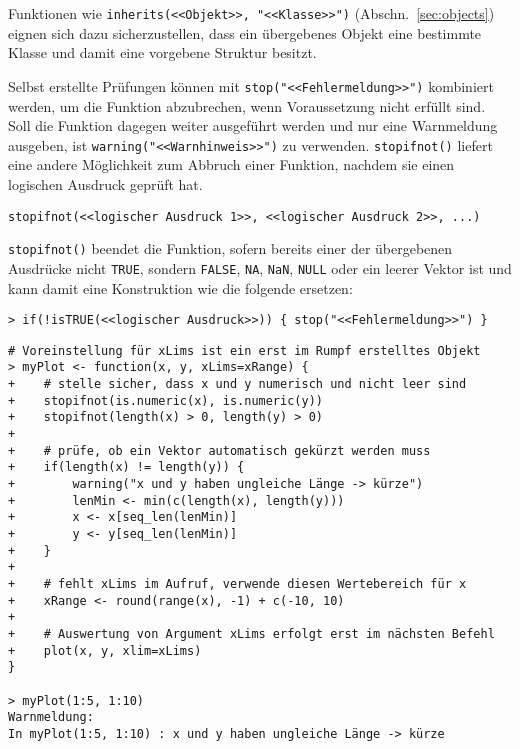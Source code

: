 Funktionen wie \lstinline!inherits(<<Objekt>>, "<<Klasse>>")! (Abschn.\ \ref{sec:objects}) eignen sich dazu sicherzustellen, dass ein übergebenes Objekt eine bestimmte Klasse und damit eine vorgebene Struktur besitzt.

Selbst erstellte Prüfungen können mit  \lstinline!stop("<<Fehlermeldung>>")! kombiniert werden, um die Funktion abzubrechen, wenn Voraussetzung nicht erfüllt sind. Soll die Funktion dagegen weiter ausgeführt werden und nur eine Warnmeldung ausgeben, ist  \lstinline!warning("<<Warnhinweis>>")! zu verwenden. \lstinline!stopifnot()! liefert eine andere Möglichkeit zum Abbruch einer Funktion, nachdem sie einen logischen Ausdruck geprüft hat.
\begin{lstlisting}
stopifnot(<<logischer Ausdruck 1>>, <<logischer Ausdruck 2>>, ...)
\end{lstlisting}

\lstinline!stopifnot()! beendet die Funktion, sofern bereits einer der übergebenen Ausdrücke nicht \lstinline!TRUE!, sondern \lstinline!FALSE!, \lstinline!NA!, \lstinline!NaN!, \lstinline!NULL! oder ein leerer Vektor ist und kann damit eine Konstruktion wie die folgende ersetzen:
\begin{lstlisting}
> if(!isTRUE(<<logischer Ausdruck>>)) { stop("<<Fehlermeldung>>") }
\end{lstlisting}

\begin{lstlisting}
# Voreinstellung für xLims ist ein erst im Rumpf erstelltes Objekt
> myPlot <- function(x, y, xLims=xRange) {
+    # stelle sicher, dass x und y numerisch und nicht leer sind
+    stopifnot(is.numeric(x), is.numeric(y))
+    stopifnot(length(x) > 0, length(y) > 0)
+
+    # prüfe, ob ein Vektor automatisch gekürzt werden muss
+    if(length(x) != length(y)) {
+        warning("x und y haben ungleiche Länge -> kürze")
+        lenMin <- min(c(length(x), length(y)))
+        x <- x[seq_len(lenMin)]
+        y <- y[seq_len(lenMin)]
+    }
+
+    # fehlt xLims im Aufruf, verwende diesen Wertebereich für x
+    xRange <- round(range(x), -1) + c(-10, 10)
+
+    # Auswertung von Argument xLims erfolgt erst im nächsten Befehl
+    plot(x, y, xlim=xLims)
}

> myPlot(1:5, 1:10)
Warnmeldung:
In myPlot(1:5, 1:10) : x und y haben ungleiche Länge -> kürze
\end{lstlisting}

